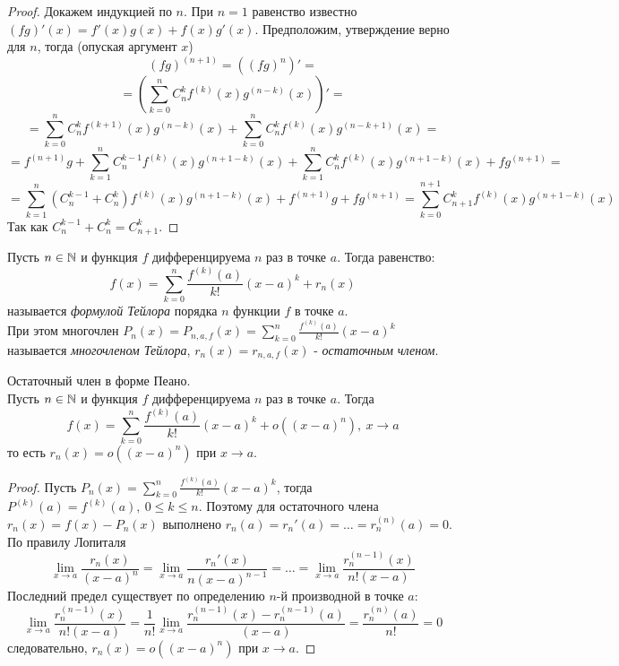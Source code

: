     \begin{proof}
        Докажем индукцией по $n$. При $n = 1$ равенство известно $(fg)'(x) = f'(x)g(x) + f(x)g'(x)$.
        Предположим, утверждение верно для $n$, тогда (опуская аргумент $x$)
        \[(fg)^{(n+1)} = ((fg)^{n})' = \]
        \[= (\sum_{k = 0}^{n} C_{n}^{k}f^{(k)}(x)g^{(n-k)}(x))' = \]
        \[= \sum_{k = 0}^{n} C_{n}^{k}f^{(k+1)}(x)g^{(n-k)}(x) + \sum_{k = 0}^{n} C_{n}^{k}f^{(k)}(x)g^{(n-k+1)}(x) = \]
        \[= f^{(n+1)}g + \sum_{k = 1}^{n} C_{n}^{k-1}f^{(k)}(x)g^{(n+1-k)}(x) + \sum_{k = 1}^{n} C_{n}^{k}f^{(k)}(x)g^{(n+1-k)}(x) + fg^{(n+1)} = \]
        \[= \sum_{k = 1}^{n} (C_{n}^{k-1} + C_{n}^{k})f^{(k)}(x)g^{(n+1-k)}(x) + f^{(n+1)}g + fg^{(n+1)} =
        \sum_{k = 0}^{n+1} C_{n+1}^{k}f^{(k)}(x)g^{(n+1-k)}(x) \]
        Так как $C_{n}^{k-1} + C_{n}^{k} = C_{n+1}^{k}$.
    \end{proof}
    
    \begin{definition}
        Пусть $n \in \mathbb{N}$ и функция $f$ дифференцируема $n$ раз в точке $a$.
        Тогда равенство:
        \[f(x) = \sum_{k = 0}^{n} \frac{f^{(k)}(a)}{k!}(x-a)^k + r_n(x)\]
        называется \textit{формулой Тейлора} порядка $n$ функции $f$ в точке $a$.\\
        При этом многочлен $P_n(x) = P_{n, a, f}(x) = \sum_{k = 0}^{n} \frac{f^{(k)}(a)}{k!}(x-a)^k$
        называется \textit{многочленом Тейлора},
        $r_n(x) = r_{n, a, f}(x)$ - \textit{остаточным членом}.
    \end{definition}
    
    \begin{theorem}{Остаточный член в форме Пеано.}\\
        Пусть $n \in \mathbb{N}$ и функция $f$ дифференцируема $n$ раз в точке $a$.
        Тогда \[f(x) = \sum_{k = 0}^{n} \frac{f^{(k)}(a)}{k!}(x-a)^k + o((x-a)^n), \ x \to a\]
        то есть $r_n(x) = o((x-a)^n)$ при $x \to a$.
    \end{theorem}
    
    \begin{proof}
        Пусть $P_n(x) = \sum_{k = 0}^n \frac{f^{(k)}(a)}{k!}(x-a)^k$,
        тогда $P^{(k)}(a) = f^{(k)}(a), \ 0 \leq k \leq n$.
        Поэтому для остаточного члена $r_n(x) = f(x) - P_n(x)$
        выполнено $r_n(a) = r_n'(a) = \dots = r_n^{(n)}(a) = 0$.
        По правилу Лопиталя
        \[\lim_{x \to a} \frac{r_n(x)}{(x-a)^n} = \lim_{x \to a} \frac{r_n'(x)}{n(x-a)^{n-1}} = \dots = \lim_{x \to a} \frac{r_n^{(n-1)}(x)}{n!(x-a)}\]
        Последний предел существует по определению $n$-й производной в точке $a$:
        \[\lim_{x \to a} \frac{r_n^{(n-1)}(x)}{n!(x-a)} = \frac{1}{n!}\lim_{x \to a} \frac{r_n^{(n-1)}(x) - r_n^{(n-1)}(a)}{(x-a)} = \frac{r_n^{(n)}(a)}{n!} = 0\]
        следовательно, $r_n(x) = o((x-a)^n)$ при $x \to a$.
    \end{proof}
    
